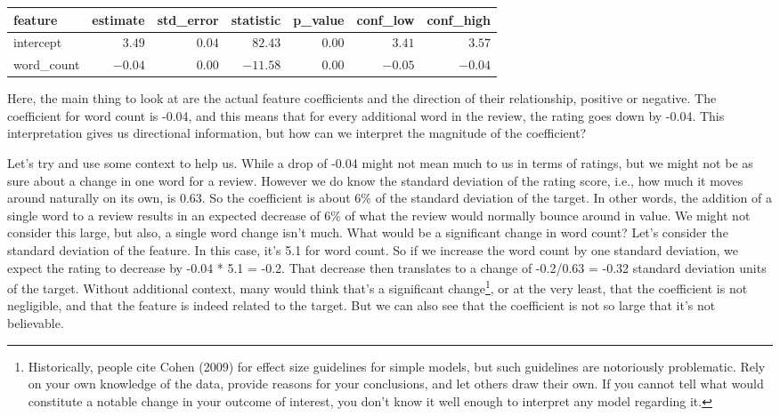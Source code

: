 \documentclass[
  letterpaper,
]{krantz}
\begin{document}
\begin{longtable*}{lrrrrrr}
\toprule
feature & estimate & std\_error & statistic & p\_value & conf\_low & conf\_high \\ 
\midrule\addlinespace[2.5pt]
intercept & \textcolor[HTML]{404040}{\textbf{$3.49$}} & \textcolor[HTML]{404040}{$0.04$} & \textcolor[HTML]{404040}{$82.43$} & \textcolor[HTML]{404040}{$0.00$} & \textcolor[HTML]{404040}{$3.41$} & \textcolor[HTML]{404040}{$3.57$} \\ 
word\_count & \textcolor[HTML]{404040}{\textbf{$-0.04$}} & \textcolor[HTML]{404040}{$0.00$} & \textcolor[HTML]{404040}{$-11.58$} & \textcolor[HTML]{404040}{$0.00$} & \textcolor[HTML]{404040}{$-0.05$} & \textcolor[HTML]{404040}{$-0.04$} \\ 
\bottomrule
\end{longtable*}

\normalsize

Here, the main thing to look at are the actual feature coefficients and
the direction of their relationship, positive or negative. The
coefficient for word count is -0.04, and this means that for every
additional word in the review, the rating goes down by -0.04. This
interpretation gives us directional information, but how can we
interpret the magnitude of the coefficient?

Let's try and use some context to help us. While a drop of -0.04 might
not mean much to us in terms of ratings, but we might not be as sure
about a change in one word for a review. However we do know the standard
deviation of the rating score, i.e., how much it moves around naturally
on its own, is 0.63. So the coefficient is about 6\% of the standard
deviation of the target. In other words, the addition of a single word
to a review results in an expected decrease of 6\% of what the review
would normally bounce around in value. We might not consider this large,
but also, a single word change isn't much. What would be a significant
change in word count? Let's consider the standard deviation of the
feature. In this case, it's 5.1 for word count. So if we increase the
word count by one standard deviation, we expect the rating to decrease
by -0.04 * 5.1 = -0.2. That decrease then translates to a change of
-0.2/0.63 = -0.32 standard deviation units of the target. Without
additional context, many would think that's a significant
change\footnote{Historically, people cite Cohen (2009) for effect size
  guidelines for simple models, but such guidelines are notoriously
  problematic. Rely on your own knowledge of the data, provide reasons
  for your conclusions, and let others draw their own. If you cannot
  tell what would constitute a notable change in your outcome of
  interest, you don't know it well enough to interpret any model
  regarding it.}, or at the very least, that the coefficient is not
negligible, and that the feature is indeed related to the target. But we
can also see that the coefficient is not so large that it's not
believable.
\end{document}
